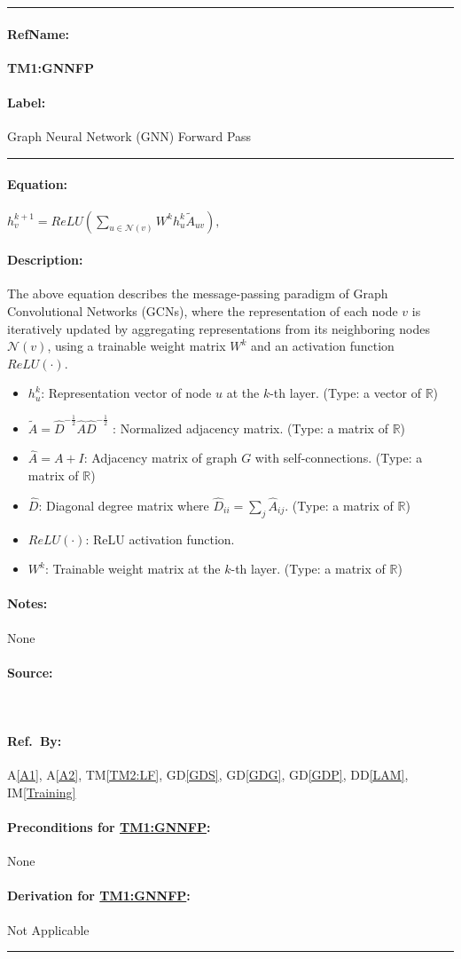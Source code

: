 \documentclass[12pt]{article}
\newcommand{\dref}[1]{GD\ref{#1}}
\newcommand{\ddref}[1]{DD\ref{#1}}
\newcommand{\tref}[1]{TM\ref{#1}}
\newcommand{\aref}[1]{A\ref{#1}}
\newcommand{\iref}[1]{IM\ref{#1}}
\newcommand{\deftheory}[9][Not Applicable]
{
\newpage
\noindent \rule{\textwidth}{0.5mm}

\paragraph{RefName: } \textbf{#2} \phantomsection 
\label{#2}

\paragraph{Label:} #3

\noindent \rule{\textwidth}{0.5mm}

\paragraph{Equation:}

#4

\paragraph{Description:}

#5

\paragraph{Notes:}

#6

\paragraph{Source:}

#7

\paragraph{Ref.\ By:}

#8

\paragraph{Preconditions for \hyperref[#2]{#2}:}
\label{#2_precond}

#9

\paragraph{Derivation for \hyperref[#2]{#2}:}
\label{#2_deriv}

#1

\noindent \rule{\textwidth}{0.5mm}

}
\begin{document}
\noindent
\deftheory
{TM1:GNNFP}
{Graph Neural Network (GNN) Forward Pass}
{
  $h_v^{k+1} = ReLU \left( \sum_{u \in \mathcal{N}(v)} W^k h_u^k \tilde{A}_{uv} \right),$
}
{The above equation describes the message-passing paradigm of Graph Convolutional Networks (GCNs), where the representation of each node \( v \) is iteratively updated by aggregating representations from its neighboring nodes \( \mathcal{N}(v) \), using a trainable weight matrix \( W^k \) and an activation function \(ReLU(\cdot)\).


\begin{itemize}
    \item \( h_u^k \): Representation vector of node \( u \) at the \( k \)-th layer. (Type: a vector of $\mathbb{R}$)
    \item \( \tilde{A} = \hat{D}^{-\frac{1}{2}} \hat{A} \hat{D}^{-\frac{1}{2}} \) :  Normalized adjacency matrix. (Type: a matrix of $\mathbb{R}$)
    \item \( \hat{A} = A + I \):  Adjacency matrix of graph \( G \) with self-connections. (Type: a matrix of $\mathbb{R}$)
    \item \( \hat{D} \):  Diagonal degree matrix where \( \hat{D}_{ii} = \sum_j \hat{A}_{ij} \). (Type: a matrix of $\mathbb{R}$)
    \item \(ReLU (\cdot) \):  ReLU activation function.
    \item \( W^k \):  Trainable weight matrix at the \( k \)-th layer. (Type: a matrix of $\mathbb{R}$)
\end{itemize}
}
{
None
}
{
  ~\citep{kipf2016}
}
{
  \aref{A1}, \aref{A2}, \tref{TM2:LF}, \dref{GDS}, \dref{GDG}, \dref{GDP}, \ddref{LAM}, \iref{Training}
}
{
None
}
{}
\end{document}
